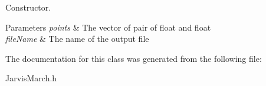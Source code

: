 Constructor. 


\begin{DoxyParams}{Parameters}
{\em points} & The vector of pair of float and float \\
\hline
{\em file\+Name} & The name of the output file \\
\hline
\end{DoxyParams}


The documentation for this class was generated from the following file\+:\begin{DoxyCompactItemize}
\item 
Jarvis\+March.\+h\end{DoxyCompactItemize}
